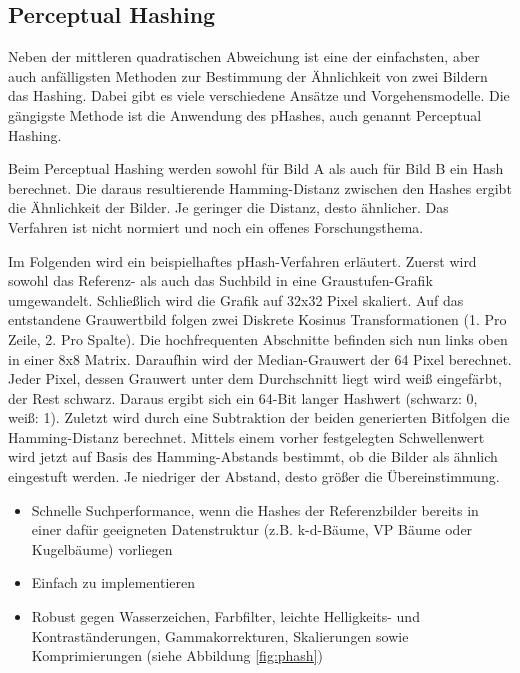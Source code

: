 \subsection{Perceptual Hashing}
Neben der mittleren quadratischen Abweichung ist eine der einfachsten, aber auch
anfälligsten Methoden zur Bestimmung der Ähnlichkeit von zwei Bildern das
Hashing. Dabei gibt es viele verschiedene Ansätze und Vorgehensmodelle. Die
gängigste Methode ist die Anwendung des pHashes, auch genannt Perceptual Hashing.
\parencite{hashing-apiumhub}

Beim Perceptual Hashing werden sowohl für Bild A als auch für Bild B ein Hash
berechnet. Die daraus resultierende Hamming-Distanz zwischen den Hashes ergibt
die Ähnlichkeit der Bilder. Je geringer die Distanz, desto ähnlicher. Das
Verfahren ist nicht normiert und noch ein offenes
Forschungsthema. \parencite{hashing-phash}

Im Folgenden wird ein beispielhaftes pHash-Verfahren erläutert. Zuerst wird
sowohl das Referenz- als auch das Suchbild in eine Graustufen-Grafik
umgewandelt. Schließlich wird die Grafik auf 32x32 Pixel skaliert. Auf das
entstandene Grauwertbild folgen zwei Diskrete Kosinus Transformationen (1. Pro
Zeile, 2. Pro Spalte). Die hochfrequenten Abschnitte befinden sich nun links
oben in einer 8x8 Matrix. Daraufhin wird der Median-Grauwert der 64 Pixel
berechnet. Jeder Pixel, dessen Grauwert unter dem Durchschnitt liegt wird weiß
eingefärbt, der Rest schwarz. Daraus ergibt sich ein 64-Bit langer Hashwert
(schwarz: 0, weiß: 1). Zuletzt wird durch eine Subtraktion der beiden
generierten Bitfolgen die Hamming-Distanz berechnet. Mittels einem vorher
festgelegten Schwellenwert wird jetzt auf Basis des Hamming-Abstands bestimmt,
ob die Bilder als ähnlich eingestuft werden. Je niedriger der Abstand, desto
größer die Übereinstimmung. \parencite{hashing-apiumhub}

\begin{itemize}[topsep=0pt]
    \item Schnelle Suchperformance, wenn die Hashes der Referenzbilder bereits
    in einer dafür geeigneten Datenstruktur (z.B. k-d-Bäume, VP Bäume oder
    Kugelbäume) vorliegen \parencite{hashing-lvngd}
    \item Einfach zu implementieren
    \item Robust gegen Wasserzeichen, Farbfilter, leichte Helligkeits- und
    Kontraständerungen, Gammakorrekturen, Skalierungen sowie Komprimierungen
    (siehe Abbildung \ref{fig:phash})
    \parencite{hashing-phash}
\end{itemize}

